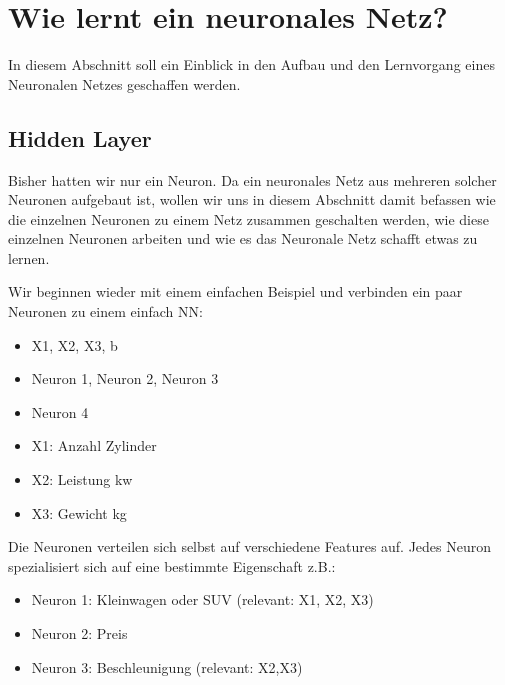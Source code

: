 \documentclass[letterpaper,10pt,english]{jupyterBook}
\begin{document}
\chapter{Wie lernt ein neuronales Netz?}
\label{\detokenize{02_NN/NN_learning:wie-lernt-ein-neuronales-netz}}\label{\detokenize{02_NN/NN_learning::doc}}
\sphinxAtStartPar
In diesem Abschnitt soll ein Einblick in den Aufbau und den Lernvorgang eines Neuronalen Netzes geschaffen werden.


\section{Hidden Layer}
\label{\detokenize{02_NN/NN_learning:hidden-layer}}
\sphinxAtStartPar
Bisher hatten wir nur ein Neuron. Da ein neuronales Netz aus mehreren solcher Neuronen aufgebaut ist, wollen wir uns in diesem Abschnitt damit befassen wie die einzelnen Neuronen zu einem Netz zusammen geschalten werden, wie diese einzelnen Neuronen arbeiten und wie es das Neuronale Netz schafft etwas zu lernen.

\sphinxAtStartPar
{}
Wir beginnen wieder mit einem einfachen Beispiel und verbinden ein paar Neuronen zu einem einfach NN:
\begin{itemize}
\item {} 
\sphinxAtStartPar
{} X1, X2, X3, b

\item {} 
\sphinxAtStartPar
{} Neuron 1, Neuron 2, Neuron 3

\item {} 
\sphinxAtStartPar
{} Neuron 4

\end{itemize}

\sphinxAtStartPar
{}
\begin{itemize}
\item {} 
\sphinxAtStartPar
X1: Anzahl Zylinder

\item {} 
\sphinxAtStartPar
X2: Leistung kw

\item {} 
\sphinxAtStartPar
X3: Gewicht kg

\end{itemize}

\sphinxAtStartPar
Die Neuronen verteilen sich selbst auf verschiedene Features auf.
Jedes Neuron spezialisiert sich auf eine bestimmte Eigenschaft z.B.:
\begin{itemize}
\item {} 
\sphinxAtStartPar
Neuron 1: Kleinwagen oder SUV (relevant: X1, X2, X3)

\item {} 
\sphinxAtStartPar
Neuron 2: Preis

\item {} 
\sphinxAtStartPar
Neuron 3: Beschleunigung (relevant: X2,X3)

\end{itemize}
\end{document}
